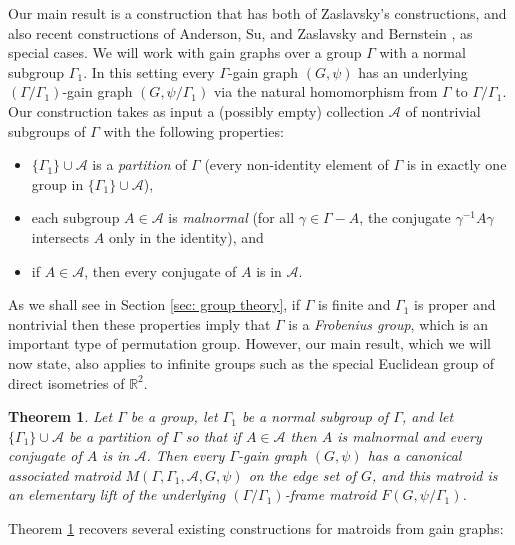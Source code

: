 \documentclass[12pt]{article}
\newtheorem{theorem}{Theorem}[section]
\theoremstyle{definition}
\newcommand{\cA}{\mathcal{A}}
\begin{document}
Our main result is a construction that has both of Zaslavsky's constructions, and also recent constructions of Anderson, Su, and Zaslavsky \cite{Anderson-Su-Zaslavsky2024} and Bernstein \cite{Bernstein2022}, as special cases.
We will work with gain graphs over a group $\Gamma$ with a normal subgroup $\Gamma_1$.
In this setting every $\Gamma$-gain graph $(G, \psi)$ has an underlying $(\Gamma/\Gamma_1)$-gain graph $(G, \psi/{\Gamma_1})$ via the natural homomorphism from $\Gamma$ to $\Gamma/\Gamma_1$.
Our construction takes as input a (possibly empty) collection $\cA$ of nontrivial subgroups of $\Gamma$ with the following properties:
\begin{itemize}[leftmargin=1.5em]
    \item $ \{\Gamma_1\} \cup \cA$ is a \emph{partition} of $\Gamma$ (every non-identity element of $\Gamma$ is in exactly one group in $\{\Gamma_1\} \cup \cA$),

    \item each subgroup $A \in \cA$ is \emph{malnormal} (for all $\gamma \in \Gamma - A$, the conjugate $\gamma^{-1}A\gamma$ intersects $A$ only in the identity), and 

    \item if $A \in \cA$, then every conjugate of $A$ is in $\cA$.
\end{itemize}
As we shall see in Section \ref{sec: group theory},  if $\Gamma$ is finite and $\Gamma_1$ is proper and nontrivial then these properties imply that
$\Gamma$ is a \emph{Frobenius group}, which is an important type of permutation group.
However, our main result, which we will now state, also applies to infinite groups such as the special Euclidean group of direct isometries of $\mathbb R^2$.




\begin{theorem} \label{thm: main}
Let $\Gamma$ be a group, let $\Gamma_1$ be a normal subgroup of $\Gamma$, and let $\{\Gamma_1\} \cup \cA$ be a partition of $\Gamma$ so that if $A \in \cA$ then $A$ is malnormal and every conjugate of $A$ is in $\cA$.
Then every $\Gamma$-gain graph $(G, \psi)$ has a canonical associated matroid $M(\Gamma, \Gamma_1, \cA, G, \psi)$ on the edge set of $G$, and this matroid is an elementary lift of the underlying $(\Gamma/\Gamma_1)$-frame matroid $F(G, \psi/\Gamma_1)$.
\end{theorem}

\noindent
Theorem \ref{thm: main} recovers several existing constructions for matroids from gain graphs:
\end{document}
